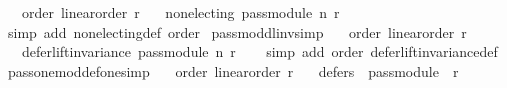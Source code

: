 \begin{isabellebody}
\ \ \ order{\isacharcolon}{\kern0pt}\ {\isachardoublequoteopen}linear{\isacharunderscore}{\kern0pt}order\ r{\isachardoublequoteclose}\isanewline
\ \ \ {\isachardoublequoteopen}non{\isacharunderscore}{\kern0pt}electing\ {\isacharparenleft}{\kern0pt}pass{\isacharunderscore}{\kern0pt}module\ n\ r{\isacharparenright}{\kern0pt}{\isachardoublequoteclose}\isanewline
%
\isadelimproof
\ \ %
\endisadelimproof
%
\isatagproof
{}\isamarkupfalse%
\ {\isacharparenleft}{\kern0pt}simp\ add{\isacharcolon}{\kern0pt}\ non{\isacharunderscore}{\kern0pt}electing{\isacharunderscore}{\kern0pt}def\ order{\isacharparenright}{\kern0pt}%
\endisatagproof
{\isafoldproof}%
%
\isadelimproof
%
\endisadelimproof
%
\isadelimdocument
%
\endisadelimdocument
%
\isatagdocument
%
\isamarkuptrue%
%
\endisatagdocument
{\isafolddocument}%
%
\isadelimdocument
%
\endisadelimdocument
{}\isamarkupfalse%
\ pass{\isacharunderscore}{\kern0pt}mod{\isacharunderscore}{\kern0pt}dl{\isacharunderscore}{\kern0pt}inv{\isacharbrackleft}{\kern0pt}simp{\isacharbrackright}{\kern0pt}{\isacharcolon}{\kern0pt}\isanewline
\ \ \ order{\isacharcolon}{\kern0pt}\ {\isachardoublequoteopen}linear{\isacharunderscore}{\kern0pt}order\ r{\isachardoublequoteclose}\isanewline
\ \ \ {\isachardoublequoteopen}defer{\isacharunderscore}{\kern0pt}lift{\isacharunderscore}{\kern0pt}invariance\ {\isacharparenleft}{\kern0pt}pass{\isacharunderscore}{\kern0pt}module\ n\ r{\isacharparenright}{\kern0pt}{\isachardoublequoteclose}\isanewline
%
\isadelimproof
\ \ %
\endisadelimproof
%
\isatagproof
{}\isamarkupfalse%
\ {\isacharparenleft}{\kern0pt}simp\ add{\isacharcolon}{\kern0pt}\ order\ defer{\isacharunderscore}{\kern0pt}lift{\isacharunderscore}{\kern0pt}invariance{\isacharunderscore}{\kern0pt}def{\isacharparenright}{\kern0pt}%
\endisatagproof
{\isafoldproof}%
%
\isadelimproof
\isanewline
%
\endisadelimproof
\isanewline
\isanewline
{}\isamarkupfalse%
\ pass{\isacharunderscore}{\kern0pt}one{\isacharunderscore}{\kern0pt}mod{\isacharunderscore}{\kern0pt}def{\isacharunderscore}{\kern0pt}one{\isacharbrackleft}{\kern0pt}simp{\isacharbrackright}{\kern0pt}{\isacharcolon}{\kern0pt}\isanewline
\ \ \ order{\isacharcolon}{\kern0pt}\ {\isachardoublequoteopen}linear{\isacharunderscore}{\kern0pt}order\ r{\isachardoublequoteclose}\isanewline
\ \ \ {\isachardoublequoteopen}defers\ {}\ {\isacharparenleft}{\kern0pt}pass{\isacharunderscore}{\kern0pt}module\ {}\ r{\isacharparenright}{\kern0pt}{\isachardoublequoteclose}\isanewline

\end{isabellebody}
